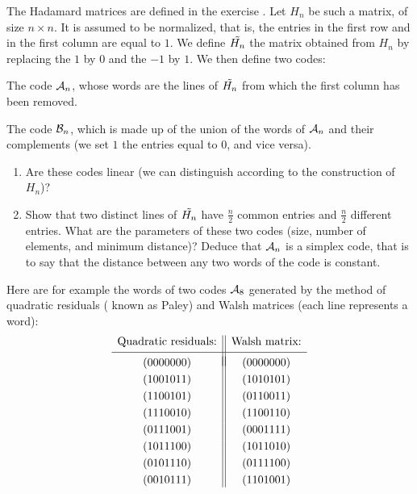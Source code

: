 \begin{exo}
   The Hadamard matrices are defined in the exercise . Let $ H_n $ be such a matrix, of size $ n \times n $. It is assumed to be normalized, that is, the entries in the first row and in the first column are equal to $ 1 $. We define $ \tilde{H_n} $ the matrix obtained from $ H_n $ by replacing the $ 1 $ by $ 0 $ and the $ -1 $ by $ 1 $. We then define two codes: \begin{rs}
\item The code $ \mathcal{A}_n $, whose words are the lines of $ \tilde{H_n} $ from which the first column has been removed.
\item The code $ \mathcal{B}_n $, which is made up of the union of the words of $ \mathcal{A}_n $ and their complements (we set $ 1 $ the entries equal to $ 0 $, and vice versa).
\end{rs} \begin{enumerate}
\item Are these codes linear (we can distinguish according to the construction of $ H_n $)?
\item {} Show that two distinct lines of $ \tilde{H_n} $ have $ \frac{n}{2} $ common entries and $ \frac{n}{2} $ different entries. What are the parameters of these two codes (size, number of elements, and minimum distance)? Deduce that $ \mathcal{A}_n $ is a simplex code, that is to say that the distance between any two words of the code is constant.
\end{enumerate}    Here are for example the words of two codes $ \mathcal{A}_8 $ generated by the method of quadratic residuals ( known as Paley) and Walsh matrices (each line represents a word):
\begin{equation}
\label{eq-code-hadamard-a8}
\begin{array}{c || c} \text{Quadratic residuals:} & \text{Walsh matrix:} \\[1mm] \hline \\[- 3mm]{(0000000)} &{(0000000)} \\[1mm]{(1001011 )} &{(1010101)} \\[1mm]{(1100101)} &{(0110011)} \\[1mm]{(1110010)} &{(1100110)} \\[1mm]{(0111001)} &{(0001111)} \\[1mm]{(1011100)} &{(1011010)} \\[1mm]{(0101110)} &{(0111100)} \\[1mm]{(0010111)} &{(1101001)} \end{array}
\end{equation}
\end{exo}
 
